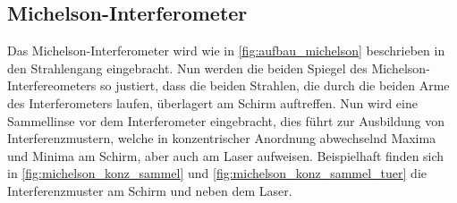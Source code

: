 \documentclass[ngerman]{scrartcl}
\begin{document}
\subsection{Michelson-Interferometer}
\label{sec:durchfuehrung_michelson}

Das Michelson-Interferometer wird wie in \autoref{fig:aufbau_michelson} beschrieben in den Strahlengang eingebracht. Nun werden die beiden Spiegel des Michelson-Interfereometers so justiert, dass die beiden Strahlen, die durch die beiden Arme des Interferometers laufen, überlagert am Schirm auftreffen. Nun wird eine Sammellinse vor dem Interferometer eingebracht, dies führt zur Ausbildung von Interferenzmustern, welche in konzentrischer Anordnung abwechselnd Maxima und Minima am Schirm, aber auch am Laser aufweisen. Beispielhaft finden sich in \autoref{fig:michelson_konz_sammel} und \autoref{fig:michelson_konz_sammel_tuer} die Interferenzmuster am Schirm und neben dem Laser.
%
\setcapindent{0pt}
\end{document}
